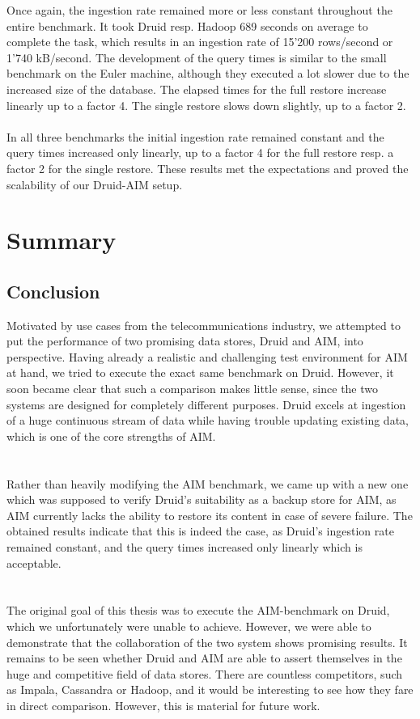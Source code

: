 \documentclass[11pt,singlecolumn]{scrartcl}
\begin{document}
Once again, the ingestion rate remained more or less constant throughout the entire benchmark. It took Druid resp. Hadoop 689 seconds on average to complete the task, which results in an ingestion rate of 15'200 rows/second or 1'740 kB/second. The development of the query times is similar to the small benchmark on the Euler machine, although they executed a lot slower due to the increased size of the database. The elapsed times for the full restore increase linearly up to a factor 4. The single restore slows down slightly, up to a factor 2. \\\\
In all three benchmarks the initial ingestion rate remained constant and the query times increased only linearly, up to a factor 4 for the full restore resp. a factor 2 for the single restore. These results met the expectations and proved the scalability of our Druid-AIM setup. 

\clearpage
\section{Summary}
\subsection{Conclusion}
Motivated by use cases from the telecommunications industry, we attempted to put the performance of two promising data stores, Druid and AIM, into perspective. Having already a realistic and challenging test environment for AIM at hand, we tried to execute the exact same benchmark on Druid. However, it soon became clear that such a comparison makes little sense, since the two systems are designed for completely different purposes. Druid excels at ingestion of a huge continuous stream of data while having trouble updating existing data, which is one of the core strengths of AIM.\\\\\\
Rather than heavily modifying the AIM benchmark, we came up with a new one which was supposed to verify Druid's suitability as a backup store for AIM, as AIM currently lacks the ability to restore its content in case of severe failure. The obtained results indicate that this is indeed the case, as Druid's ingestion rate remained constant, and the query times increased only linearly which is acceptable.\\\\\\
The original goal of this thesis was to execute the AIM-benchmark on Druid, which we unfortunately were unable to achieve. However, we were able to demonstrate that the collaboration of the two system shows promising results. It remains to be seen whether Druid and AIM are able to assert themselves in the huge and competitive field of data stores. There are countless competitors, such as Impala, Cassandra or Hadoop, and it would be interesting to see how they fare in direct comparison. However, this is material for future work.
\end{document}
